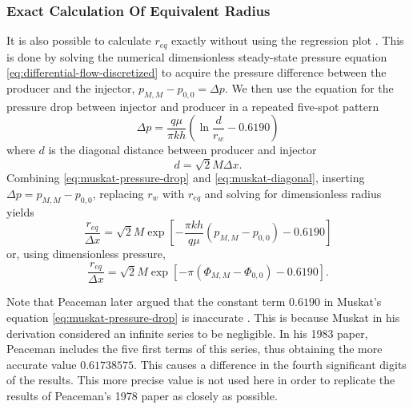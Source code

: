 \subsubsection{Exact Calculation Of Equivalent Radius} %
\label{ssub:exact_calculation_of_equivalent_radius}
It is also possible to calculate $r_{eq}$ exactly without using the regression plot \cite{Peaceman1978Interpretation}. This is done by solving the numerical dimensionless steady-state pressure equation \eqref{eq:differential-flow-discretized} to acquire the pressure difference between the producer and the injector, $p_{M,M}-p_{0,0}=\Delta p$. We then use the equation for the pressure drop between injector and producer in a repeated five-spot pattern \cite{Muskat1946Flow}
\begin{equation}
    \label{eq:muskat-pressure-drop}
    \Delta p = \frac{q\mu}{\pi k h} \left( \ln \frac{d}{r_w} - 0.6190 \right)
\end{equation}
where $d$ is the diagonal distance between producer and injector
\begin{equation}
    \label{eq:muskat-diagonal}
    d = \sqrt{2} M \Delta x.
\end{equation}
Combining \eqref{eq:muskat-pressure-drop} and \eqref{eq:muskat-diagonal}, inserting $\Delta p = p_{M,M} - p_{0,0}$, replacing $r_w$ with $r_{eq}$ and solving for dimensionless radius yields
\begin{equation}
    \label{eq:peaceman77-eqrad-exact}
    \frac{r_{eq}}{\Delta x} = \sqrt{2}M \exp\left[- \frac{\pi k h}{q\mu} \left( p_{M,M} - p_{0,0} \right) - 0.6190 \right]
\end{equation}
or, using dimensionless pressure,
\begin{equation}
    \label{eq:peaceman77-eqrad-exact-dimensionless}
    \frac{r_{eq}}{\Delta x} = \sqrt{2}M \exp\left[- \pi \left( \Phi_{M,M} - \Phi_{0,0} \right) - 0.6190 \right].
\end{equation}

Note that Peaceman later argued that the constant term $0.6190$ in Muskat's equation \eqref{eq:muskat-pressure-drop} is inaccurate \cite{Peaceman1983Interpretation}. This is because Muskat in his derivation considered an infinite series to be negligible. In his 1983 paper, Peaceman includes the five first terms of this series, thus obtaining the more accurate value $0.61738575$. This causes a difference in the fourth significant digits of the results. This more precise value is not used here in order to replicate the results of Peaceman's 1978 paper as closely as possible.




